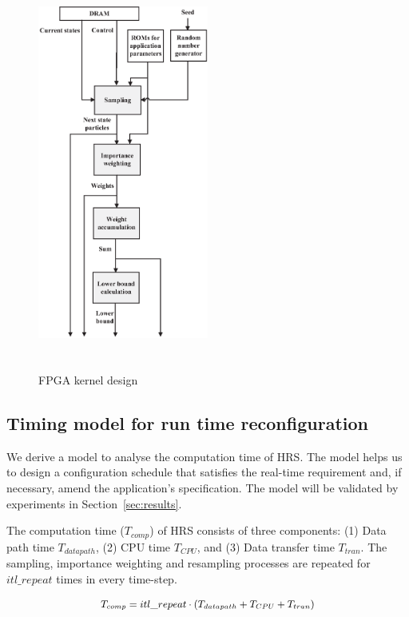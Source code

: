 \begin{figure}[t!]
\centering
\includegraphics[width=0.5\textwidth,height=130mm]{runtime_reconfiguration/figures/fig_kernel}
\caption{FPGA kernel design}
\label{fig:kernel}
\end{figure}

\subsection{Timing model for run time reconfiguration}
\label{sec:reconfig}

We derive a model to analyse the computation time of HRS.
The model helps us to design a configuration schedule that satisfies the real-time requirement and, if necessary, amend the application's specification.
The model will be validated by experiments in Section~\ref{sec:results}.

The computation time ($T_{comp}$) of HRS consists of three components: (1) Data path time $T_{datapath}$, (2) CPU time $T_{CPU}$, and (3) Data transfer time $T_{tran}$.
The sampling, importance weighting and resampling processes are repeated for $itl\_repeat$ times in every time-step.

\begin{equation}
\small
\begin{aligned}
T_{comp} = itl\_repeat \cdot \left ( T_{datapath} + T_{CPU} + T_{tran} \right )
\end{aligned}
\label{eqt:total}
\end{equation}

